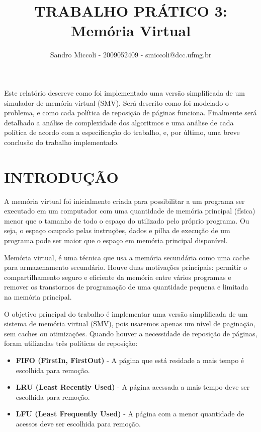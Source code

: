 \documentclass[12pt]{article}
\title{TRABALHO PRÁTICO 3: \\ Memória Virtual}
\author{Sandro Miccoli - 2009052409 - smiccoli@dcc.ufmg.br}
\begin{document}
\maketitle

\begin{resumo}
Este relatório descreve como foi implementado uma versão simplificada de um simulador de memória virtual (SMV). Será descrito como foi modelado o problema, e como cada política de reposição de páginas funciona. Finalmente será detalhado a análise de complexidade dos algoritmos e uma análise de cada política de acordo com a especificação do trabalho, e, por último, uma breve conclusão do trabalho implementado.
\end{resumo}

\section{INTRODUÇÃO}

    A memória virtual foi inicialmente criada para possibilitar a um programa ser executado em um computador com uma quantidade de memória principal (física) menor que o tamanho de todo o espaço do utilizado pelo próprio programa. Ou seja, o espaço ocupado pelas instruções, dados e pilha de execução de um programa pode ser maior que o espaço em memória principal disponível.

    Memória virtual, é uma técnica que usa a memória secundária como uma cache para armazenamento secundário. Houve duas motivações principais: permitir o compartilhamento seguro e eficiente da memória entre vários programas e remover os transtornos de programação de uma quantidade pequena e limitada na memória principal. \cite{wikimv}

    O objetivo principal do trabalho é implementar uma versão simplificada de um sistema de memória virtual (SMV), pois usaremos apenas um nível de paginação, sem caches ou otimizações. Quando houver a necessidade de reposição de páginas, foram utilizadas três políticas de reposição:

    \begin{itemize}
    \item \textbf{FIFO (FirstIn, FirstOut)} - A página que está residade a mais tempo é escolhida para remoção.
    \item \textbf{LRU (Least Recently Used)} - A página acessada a mais tempo deve ser escolhida para remoção.
    \item \textbf{LFU (Least Frequently Used)} - A página com a menor quantidade de acessos deve ser escolhida para remoção.
    \end{itemize}
\end{document}
